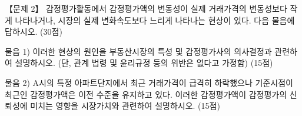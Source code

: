 \begin{longquestion}{【문제 2】}
감정평가활동에서 감정평가액의 변동성이 실제 거래가격의 변동성보다 작게 나타나거나, 시장의 실제 변화속도보다 느리게 나타나는 현상이 있다. 다음 물음에 답하시오. (30점) \par
\medskip\noindent 물음 1) 이러한 현상의 원인을 부동산시장의 특성 및 감정평가사의 의사결정과 관련하여 설명하시오. (단, 관계 법령 및 윤리규정 등의 위반은 없다고 가정함) (15점) \par
\medskip\noindent 물음 2) A시의 특정 아파트단지에서 최근 거래가격이 급격히 하락했으나 기준시점이 최근인 감정평가액은 이전 수준을 유지하고 있다. 이러한 감정평가액이 감정평가의 신뢰성에 미치는 영향을 시장가치와 관련하여 설명하시오. (15점) \par
\end{longquestion}
